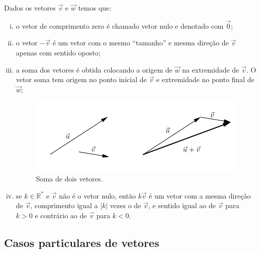 Dados os vetores $\vec{v}$ e $\vec{w}$ temos que:
\begin{enumerate}[i)]
\item o vetor de comprimento zero é chamado vetor nulo e denotado com $\overrightarrow{0}$;
\item o vetor $-\vec{v}$ é um vetor com o mesmo ``tamanho'' e mesma direção de $\vec{v}$ apenas com sentido oposto;
\item a soma dos vetores é obtida colocando a origem de $\vec{w}$ na extremidade de $\vec{v}$. O vetor soma tem origem no ponto inicial de $\vec{v}$ e extremidade no ponto final de $\vec{w}$;
 
\begin{figure}[H]
\centering
\includegraphics[scale=1.2]{analitica/imagens/vetor4.png}
\caption{Soma de dois vetores.}
\label{fig:somavetor}
\end{figure}

\vspace{-0.4cm}
\item se $k\in \mathbb{R}^{*}$ e $\vec{v}$ não é o vetor nulo, então $k\vec{v}$ é um vetor com a mesma direção de $\vec{v}$, comprimento igual a $|k|$ vezes o de $\vec{v}$, e sentido igual ao de $\vec{v}$ para $k>0$ e contrário ao de $\vec{v}$ para $k<0$.
\end{enumerate}

\subsection{Casos particulares de vetores}

